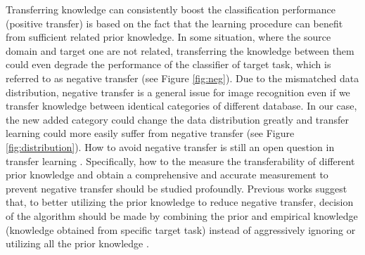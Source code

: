 Transferring knowledge can consistently boost the classification performance (positive transfer) is based on the fact that the learning procedure can benefit from sufficient related prior knowledge. In some situation, where the source domain and target one are not related, transferring the knowledge between them could even degrade the performance of the classifier of target task, which is referred to as negative transfer (see Figure \ref{fig:neg}). 
Due to the mismatched data distribution, negative transfer is a general issue for image recognition even if we transfer knowledge between identical categories of different database. In our case, the new added category could change the data distribution greatly and transfer learning could more easily suffer from negative transfer (see Figure \ref{fig:distribution}). 
How to avoid negative transfer is still an open question in transfer learning \cite{Lu201514}. Specifically, how to the measure the transferability of different prior knowledge and obtain a comprehensive and accurate measurement to prevent negative transfer should be studied profoundly. Previous works suggest that, to better utilizing the prior knowledge to reduce negative transfer, decision of the algorithm should be made by combining the prior and empirical knowledge (knowledge obtained from specific target task) instead of aggressively ignoring or utilizing all the prior knowledge \cite{tommasi2014learning} \cite{kuzborskij2013n} \cite{yang2007cross} \cite{aytar2011tabula}.

